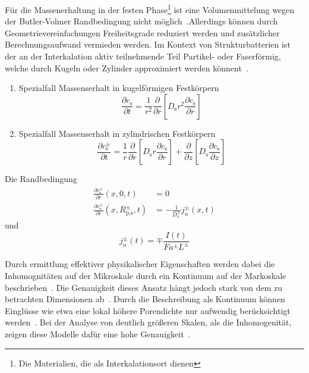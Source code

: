 Für die Massenerhaltung in der festen Phase\footnote{Die Materialien, die als Interkalationsort dienen} ist eine Volumenmittelung wegen der Butler-Volmer Randbedingung nicht möglich~\cite{Plett2015}.Allerdings können durch Geometrievereinfachungen Freiheitsgrade reduziert werden und zusätzlicher Berechnungsaufwand vermieden werden. Im Kontext von Strukturbatterien ist der an der Interkalation aktiv teilnehmende Teil Partikel- oder Faserförmig, welche durch Kugeln oder Zylinder approximiert werden könnent~\cite{Newman2021}.
\begin{enumerate}
    \item Spezialfall Massenserhalt in kugelförmigen Festkörpern
    \begin{equation}
    \frac{\partial c_{\text{s}}}{\partial t} = \frac{1}{r^2} \frac{\partial}{ \partial r} \left[ D_{\text{s}} r^2 \frac{\partial c_{\text{s}}}{\partial r}\right]
    \end{equation}
    \item Spezialfall Massenserhalt in zylindrischen Festkörpern
    \begin{equation}
    \frac{\partial c_{\text{s}}^{\pm}}{\partial t} = \frac{1}{r} \frac{\partial}{ \partial r} \left[ D_{\text{s}} r \frac{\partial c_{\text{s}}}{\partial r}\right] + \frac{\partial}{ \partial z}\left[D_{\text{s}}  \frac{\partial c_{\text{s}}}{\partial z}\right]
    \end{equation}
\end{enumerate}
Die Randbedingung
\begin{align}
    \frac{\partial c_{\text{s}}^{\pm}}{\partial r}(x,0,t) &= 0 \\
    \frac{\partial c_{\text{s}}^{\pm}}{\partial r}(x,R_{\text{p,s}}^{\pm},t) &= -\frac{1}{ D_{\text{s}}^\pm} j_{n}^{\pm}(x,t)
\end{align}
und
\begin{equation}
j_{n}^{\pm}(t) = \mp \frac{I(t)}{F a^{\pm} L^{\pm}}
\end{equation}

Durch ermittlung effektiver physikalischer Eigenschaften werden dabei die Inhomognitäten auf der Mikroskale durch ein Kontinuum auf der Markoskale beschrieben~\cite{Plett2024}. Die Genauigkeit dieses Ansatz hängt jedoch stark von dem zu betrachten Dimensionen ab~\cite{Plett2015}. Durch die Beschreibung als Kontinuum können Einglüsse wie etwa eine lokal höhere Porendichte nur aufwendig berücksichtigt werden~\cite{Mei2019}. Bei der Analyse von deutlich größeren Skalen, als die Inhomogenität, zeigen diese Modelle dafür eine hohe Genauigkeit~\cite{Plett2015}. 



